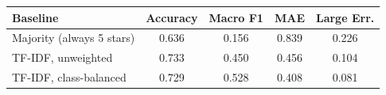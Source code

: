 \begin{tabular}{lcccc}
\toprule
Baseline & Accuracy & Macro F1 & MAE & Large Err. \\
\midrule
Majority (always 5 stars) & 0.636 & 0.156 & 0.839 & 0.226 \\
TF-IDF, unweighted & 0.733 & 0.450 & 0.456 & 0.104 \\
TF-IDF, class-balanced & 0.729 & 0.528 & 0.408 & 0.081 \\
\bottomrule
\end{tabular}
